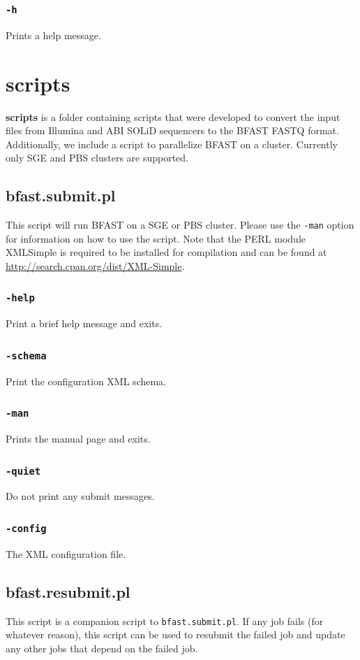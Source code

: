 \documentclass[a4paper,12pt]{book}
\newcommand{\TT}[1]{{\tt #1}} %
\newcommand{\BF}[1]{{\bf #1}} %
\begin{document}
\subsubsection{\TT{-h}}
Prints a help message.
\section{scripts}
\label{sec:scripts}
\BF{scripts} is a folder containing scripts that were developed to convert the input files from Illumina and ABI SOLiD sequencers to the BFAST FASTQ format.
Additionally, we include a script to parallelize BFAST on a cluster.
Currently only SGE and PBS clusters are supported.

\subsection{bfast.submit.pl}
This script will run BFAST on a SGE or PBS cluster.
Please use the \TT{-man} option for information on how to use the script.
Note that the PERL module XML\:\:Simple is required to be installed for compilation and can be found at \url{http://search.cpan.org/dist/XML-Simple}.
\subsubsection{\TT{-help}}
Print a brief help message and exits.
\subsubsection{\TT{-schema}}
Print the configuration XML schema.
\subsubsection{\TT{-man}}
Prints the manual page and exits.
\subsubsection{\TT{-quiet}}
Do not print any submit messages.
\subsubsection{\TT{-config}}
The XML configuration file.
\subsection{bfast.resubmit.pl}
This script is a companion script to \TT{bfast.submit.pl}.
If any job fails (for whatever reason), this script can be used to resubmit the failed job and update any other jobs that depend on the failed job.
\end{document}
